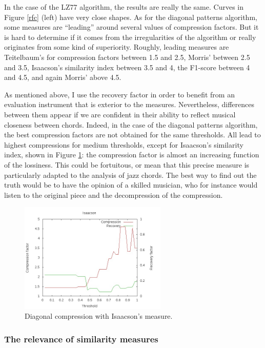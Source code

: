 \documentclass[a4paper,10pt]{article}
\newcommand{\guill}[1]{“#1”}
\begin{document}
In the case of the LZ77 algorithm, the results are really the same. Curves in Figure \ref{rfc} (left) have very close shapes. As for the diagonal patterns algorithm, some measures are \guill{leading} around several values of compression factors. But it is hard to determine if it comes from the irregularities of the algorithm or really originates from some kind of superiority. Roughly, leading measures are Teitelbaum's for compression factors between 1.5 and 2.5, Morris' between 2.5 and 3.5, Isaacson's similarity index between 3.5 and 4, the F1-score between 4 and 4.5, and again Morris' above 4.5.

As mentioned above, I use the recovery factor in order to benefit from an evaluation instrument that is exterior to the measures. Nevertheless, differences between them appear if we are confident in their ability to reflect musical closeness between chords. Indeed, in the case of the diagonal patterns algorithm, the best compression factors are not obtained for the same thresholds. All lead to highest compressions for medium thresholds, except for Isaacson's similarity index, shown in Figure \ref{isaacson}: the compression factor is almost an increasing function of the lossiness. This could be fortuitous, or mean that this precise measure is particularly adapted to the analysis of jazz chords. The best way to find out the truth would be to have the opinion of a skilled musician, who for instance would listen to the original piece and the decompression of the compression.

\begin{figure}[h]
\centering
\includegraphics[width=7cm]{images/IsaacsonDiag.jpg}
\caption{Diagonal compression with Isaacson's measure.\label{isaacson}}
\end{figure}

\subsubsection*{The relevance of similarity measures}
\end{document}
